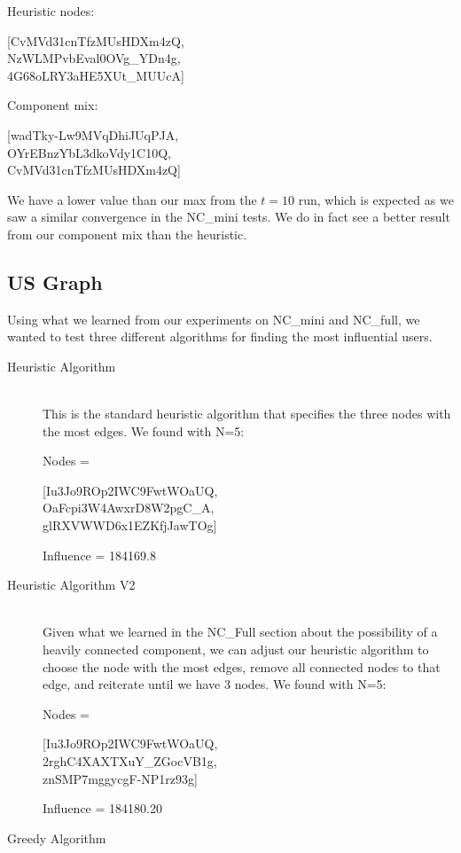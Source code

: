 \documentclass{article}
\begin{document}
		Heuristic nodes: 
		\begin{center}
		[CvMVd31cnTfzMUsHDXm4zQ, \\
		NzWLMPvbEval0OVg\_YDn4g,\\
		4G68oLRY3aHE5XUt\_MUUcA]\\
		\end{center}

		Component mix: 
		\begin{center}
		[wadTky-Lw9MVqDhiJUqPJA,\\
		OYrEBnzYbL3dkoVdy1C10Q,\\
		CvMVd31cnTfzMUsHDXm4zQ]\\
 		\end{center}

		We have a lower value than our max from the $t=10$ run, which is expected as we saw a similar convergence in the NC\_mini tests. We do in fact see a better result from our component mix than the heuristic.

	\subsection{US Graph}

		Using what we learned from our experiments on NC\_mini and NC\_full, we wanted to test three different algorithms for finding the most influential users.

		\begin{description}
		\item[Heuristic Algorithm] \hfill \\
			This is the standard heuristic algorithm that specifies the three nodes with the most edges. We found with N=5:

			Nodes = \begin{center}
					[Iu3Jo9ROp2IWC9FwtWOaUQ,\\
					OaFcpi3W4AwxrD8W2pgC\_A,\\
 					glRXVWWD6x1EZKfjJawTOg]\\
			 		\end{center}

			 Influence = 184169.8

		\item[Heuristic Algorithm V2] \hfill \\
			Given what we learned in the NC\_Full section about the possibility of a heavily connected component, we can adjust our heuristic algorithm to choose the node with the most edges, remove all connected nodes to that edge, and reiterate until we have 3 nodes. We found with N=5:

			Nodes = \begin{center}
					[Iu3Jo9ROp2IWC9FwtWOaUQ,\\
 					2rghC4XAXTXuY\_ZGocVB1g,\\
 					znSMP7mggycgF-NP1rz93g]\\
			 		\end{center}

			 Influence = 184180.20

		\item[Greedy Algorithm] \hfill \\
			
			
	\end{description}
\end{document}
